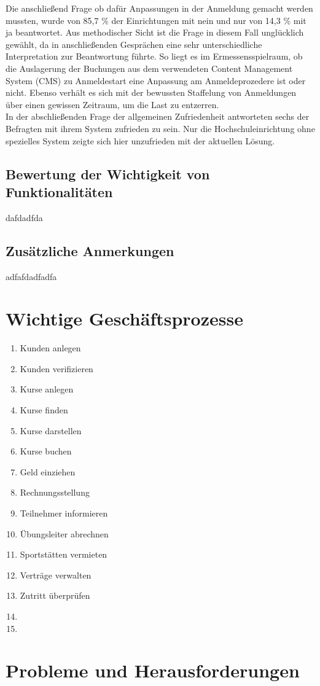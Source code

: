 Die anschließend Frage ob dafür Anpassungen in der Anmeldung gemacht werden mussten, wurde von 85,7 \% der Einrichtungen mit nein und nur von 14,3 \% mit ja beantwortet. Aus methodischer Sicht ist die Frage in diesem Fall unglücklich gewählt, da in anschließenden Gesprächen eine sehr unterschiedliche Interpretation zur Beantwortung führte. So liegt es im Ermessensspielraum, ob die Auslagerung der Buchungen aus dem verwendeten Content Management System (CMS) zu Anmeldestart eine Anpassung am Anmeldeprozedere ist oder nicht. Ebenso verhält es sich mit der bewussten Staffelung von Anmeldungen über einen gewissen Zeitraum, um die Last zu entzerren.
\\
In der abschließenden Frage der allgemeinen Zufriedenheit antworteten sechs der Befragten mit ihrem System zufrieden zu sein. Nur die Hochschuleinrichtung ohne spezielles System zeigte sich hier unzufrieden mit der aktuellen Lösung.

\subsection{Bewertung der Wichtigkeit von Funktionalitäten}
dafdadfda

\subsection{Zusätzliche Anmerkungen}
adfafdadfadfa


\section{Wichtige Geschäftsprozesse}
\begin{enumerate}
\item Kunden anlegen
\item Kunden verifizieren
\item Kurse anlegen
\item Kurse finden
\item Kurse darstellen
\item Kurse buchen
\item Geld einziehen
\item Rechnungsstellung
\item Teilnehmer informieren
\item Übungsleiter abrechnen
\item Sportstätten vermieten
\item Verträge verwalten
\item Zutritt überprüfen
\item 
\item 
\end{enumerate}
\section{Probleme und Herausforderungen}